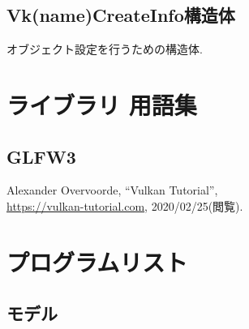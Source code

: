 \documentclass{suribt}
\begin{document}
\section{Vk(name)CreateInfo構造体}
	オブジェクト設定を行うための構造体.

\newpage
\chapter{ライブラリ 用語集}\label{chap:3}
\section{GLFW3}

\backmatter

\begin{thebibliography}{}
	Alexander Overvoorde,
	``Vulkan Tutorial'',\\
	\url{https://vulkan-tutorial.com}, 2020/02/25(閲覧).
\end{thebibliography}

\appendix
\chapter{プログラムリスト}
\section{モデル}
\end{document}
